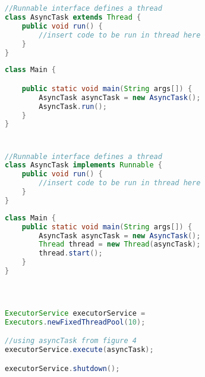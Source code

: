 \documentclass[]{report}
\begin{document}
\appendix

\chapter{}
\begin{figure}[h!]
\caption{}
\begin{lstlisting}[language=Java,frame=single]
//Runnable interface defines a thread
class AsyncTask extends Thread {
	public void run() {
		//insert code to be run in thread here
	}
}
\end{lstlisting}
\end{figure}
\begin{figure}[h!]
\caption{}
\begin{lstlisting}[language=Java,frame=single]
class Main {

	public static void main(String args[]) { 
		AsyncTask asyncTask = new AsyncTask();
		AsyncTask.run();
	}
}
\end{lstlisting}
\end{figure}

\chapter{}
\begin{figure}[h!]
\caption{}
\begin{lstlisting}[language=Java,frame=single]
//Runnable interface defines a thread
class AsyncTask implements Runnable {
	public void run() {
		//insert code to be run in thread here
	}
}	
\end{lstlisting}
\end{figure}
\begin{figure}[h!]
\caption{}
\begin{lstlisting}[language=Java,frame=single]
class Main {
	public static void main(String args[]) { 
		AsyncTask asyncTask = new AsyncTask();
		Thread thread = new Thread(asyncTask);
		thread.start();
	}
}
\end{lstlisting}
\end{figure}

\chapter{}
\begin{figure}[h!]
\caption{}
\begin{lstlisting}[language=Java,frame=single]

ExecutorService executorService = 
Executors.newFixedThreadPool(10);

//using asyncTask from figure 4
executorService.execute(asyncTask);

executorService.shutdown();
\end{lstlisting}
\end{figure}
\end{document}
